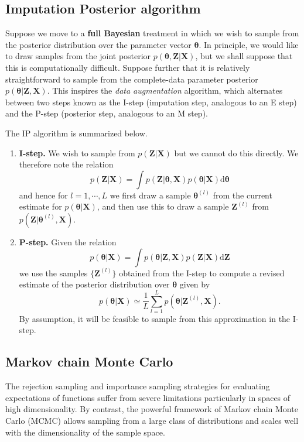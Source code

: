 \documentclass[a4paper]{book}
\newcommand{\ud}{\mathrm{d}}
\renewcommand{\bf}{\mathbf}
\newcommand{\imp}[1]{\textit{#1}}
\newcommand{\bs}{\boldsymbol}
\begin{document}
\subsection{Imputation Posterior algorithm}
Suppose we move to a \textbf{full Bayesian} treatment in which we wish to sample from the posterior distribution over the parameter vector $\bs{\theta}$. In principle, we would like to draw samples from the joint posterior $p(\bs{\theta},\bf{Z|X})$, but we shall suppose that this is computationally difficult. Suppose further that it is relatively straightforward to sample from the complete-data parameter posterior $p(\bs{\theta}|\bf{Z,X})$. This inspires the \imp{data augmentation} algorithm, which alternates between two steps known as the I-step (imputation step, analogous to an E step) and the P-step (posterior step, analogous to an M step).

The IP algorithm is summarized below.
\begin{enumerate}
	\item \textbf{I-step.} We wish to sample from $p(\bf{Z|X})$ but we cannot do this directly. We therefore note the relation
	\begin{equation}
		p(\bf{Z|X}) = \int p(\bf{Z}|\bs{\theta},\bf{X})p(\bs{\theta}|\bf{X}) \ud \bs{\theta}
	\end{equation}
	and hence for $l = 1,\cdots,L$ we first draw a sample $\bs{\theta}^{(l)}$ from the current estimate for $p(\bs{\theta}|\bf{X})$, and then use this to draw a sample $\bf{Z}^{(l)}$ from $p(\bf{Z}|\bs{\theta}^{(l)},\bf{X})$.
	\item \textbf{P-step.} Given the relation
	\begin{equation}
		p(\bs{\theta}|\bf{X}) = \int p(\bs{\theta}|\bf{Z,X})p(\bf{Z|X}) \ud \bf{Z}
	\end{equation}
	we use the samples $\{ \bf{Z}^{(l)} \}$ obtained from the I-step to compute a revised estimate of the posterior distribution over $\bs{\theta}$ given by
	\begin{equation}
		p(\bs{\theta}|\bf{X}) \simeq \frac{1}{L} \sum_{l=1}^L p(\bs{\theta}|\bf{Z}^{(l)},\bf{X}).
	\end{equation}
	By assumption, it will be feasible to sample from this approximation in the I-step.
\end{enumerate}
\subsection{Markov chain Monte Carlo}
The rejection sampling and importance sampling strategies for evaluating expectations of functions suffer from severe limitations particularly in spaces of high dimensionality. By contrast, the powerful framework of Markov chain Monte Carlo (MCMC) allows sampling from a large class of distributions and scales well with the dimensionality of the sample space.
\end{document}
